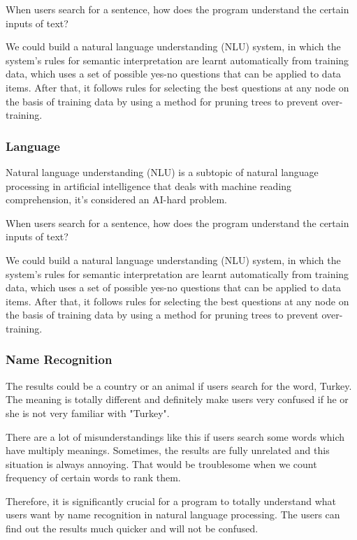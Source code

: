 When users search for a sentence, how does the program understand the certain inputs of text? 

We could build a natural language understanding (NLU) system, in which the system's rules for semantic interpretation are 
learnt automatically from training data, which uses a set of possible yes-no questions that can be applied to data items.
After that, it follows rules for selecting the best questions at any node on the basis of training data by using a method for pruning trees to prevent over-training.



\subsubsection*{Language}
Natural language understanding (NLU) is a subtopic of natural language processing in artificial intelligence that deals with machine reading comprehension, it's considered an AI-hard problem.

When users search for a sentence, how does the program understand the certain inputs of text? 

We could build a natural language understanding (NLU) system, in which the system's rules for semantic interpretation are 
learnt automatically from training data, which uses a set of possible yes-no questions that can be applied to data items.
After that, it follows rules for selecting the best questions at any node on the basis of training data by using a method for pruning trees to prevent over-training.


\subsubsection*{Name Recognition}

The results could be a country or an animal if users search for the word, Turkey. The meaning is totally different and
definitely make users very confused if he or she is not very familiar with "Turkey". 

There are a lot of misunderstandings like this if users search some words which have multiply meanings.
Sometimes, the results are fully unrelated and this situation is always annoying. 
That would be troublesome when we count frequency of certain words to rank them.

Therefore, it is significantly crucial for a program to totally understand what users want by name recognition in natural language processing. 
The users can find out the results much quicker and will not be confused.

